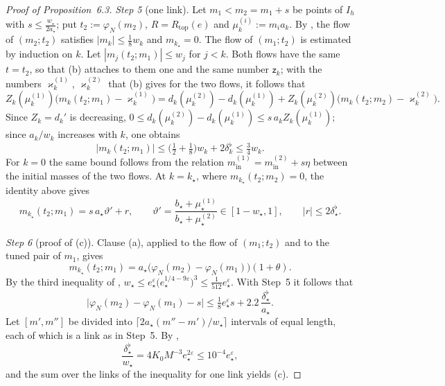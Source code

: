 \documentclass[11pt]{amsart}
\theoremstyle{definition}
\begin{document}
\begin{proof}[Proof of Proposition~6.3]
\emph{Step 5} (one link).
Let $m_1<m_2=m_1+s$ be points of $I_h$ with $s\le\frac{w_\star}{2a_\star}$;
put $t_2:=\varphi_N(m_2)$, $R=R_{\mathrm{top}}(e)$ and $\mu_k^{(i)}:=m_ia_k$.
By \cite[Proposition~28.2]{QEDIII}, the flow of $(m_2;t_2)$ satisfies $|m_k|\le\frac18w_k$ and $m_{k_\star}=0$.
The flow of $(m_1;t_2)$ is estimated by induction on $k$.
Let $|m_j(t_2;m_1)|\le w_j$ for $j<k$.
Both flows have the same $t=t_2$, so that (b) attaches to them one and the same number $\mathsf z_k$;
with the numbers $\varkappa_k^{(1)}$, $\varkappa_k^{(2)}$ that (b) gives for the two flows, it follows that
\begin{equation*}
Z_k(\mu_k^{(1)})\bigl(m_k(t_2;m_1)-\varkappa_k^{(1)}\bigr)=d_k(\mu_k^{(2)})-d_k(\mu_k^{(1)})+Z_k(\mu_k^{(2)})\bigl(m_k(t_2;m_2)-\varkappa_k^{(2)}\bigr).
\end{equation*}
Since $Z_k=d_k'$ is decreasing, $0\le d_k(\mu_k^{(2)})-d_k(\mu_k^{(1)})\le s\,a_kZ_k(\mu_k^{(1)})$;
since $a_k/w_k$ increases with $k$, one obtains
\begin{equation*}
|m_k(t_2;m_1)|\le\bigl(\tfrac12+\tfrac18\bigr)w_k+2\delta_k^\flat\le\tfrac34w_k .
\end{equation*}
For $k=0$ the same bound follows from the relation $m^{(1)}_{\mathrm{in}}=m^{(2)}_{\mathrm{in}}+s\eta$ between the initial masses of the two flows.
At $k=k_\star$, where $m_{k_\star}(t_2;m_2)=0$, the identity above gives
\begin{equation*}
m_{k_\star}(t_2;m_1)=s\,a_\star\vartheta'+r,\qquad\vartheta'=\frac{b_\star+\mu_\star^{(1)}}{b_\star+\mu_\star^{(2)}}\in[1-w_\star,1],\qquad|r|\le2\delta^\flat_\star .
\end{equation*}

\emph{Step 6} (proof of (c)).
Clause (a), applied to the flow of $(m_1;t_2)$ and to the tuned pair of $m_1$, gives
\begin{equation*}
m_{k_\star}(t_2;m_1)=a_\star\bigl(\varphi_N(m_2)-\varphi_N(m_1)\bigr)(1+\theta).
\end{equation*}
By the third inequality of \cite[(T2)]{QEDIII}, $w_\star\le e_\star^{\varepsilon}\bigl(e_\star^{1/4-9\varepsilon}\bigr)^3\le\frac1{512}e_\star^{\varepsilon}$.
With Step~5 it follows that
\begin{equation*}
\bigl|\varphi_N(m_2)-\varphi_N(m_1)-s\bigr|\le\tfrac18e_\star^{\varepsilon}s+2.2\,\frac{\delta^\flat_\star}{a_\star}.
\end{equation*}
Let $[m',m'']$ be divided into $\lceil2a_\star(m''-m')/w_\star\rceil$ intervals of equal length, each of which is a link as in Step~5.
By \cite[(fl)]{QEDIII},
\begin{equation*}
\frac{\delta^\flat_\star}{w_\star}=4K_0M^{-3}e_\star^{2\varepsilon}\le10^{-4}e_\star^{\varepsilon},
\end{equation*}
and the sum over the links of the inequality for one link yields (c).


\end{proof}
\end{document}
